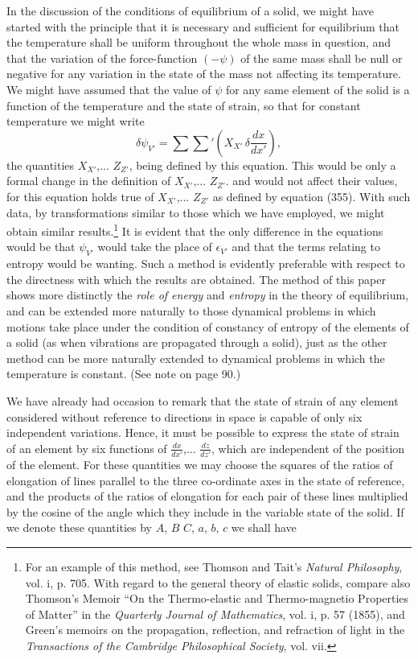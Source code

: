 \documentclass[12pt]{article}
\begin{document}
{In the discussion of the conditions of equilibrium of a solid, we might have started with the principle that it is necessary and sufficient for equilibrium that the temperature shall be uniform throughout the whole mass in question, and that the variation of the force-function $(-\psi)$ of the same mass shall be null or negative for any variation in the state of the mass not affecting its temperature.  We might have assumed that the value of $\psi$ for any same element of the solid is a function of the temperature and the state of strain, so that for constant temperature we might write
$$ \delta \psi_{V'} = \sum \sum\nolimits' \left( X_{X'}\,\delta \frac{dx}{dx'}\right) ,  $$
the quantities $X_{X'}$,... $Z_{Z'}$, being defined by this equation. This would be only a formal change in the definition of $X_{X'}$,... $Z_{Z'}$. and would not affect their values, for this equation holds true of $X_{X'}$,... $Z_{Z'}$ as defined by equation (355). With such data, by transformations similar to those which we have employed, we might obtain similar results.\footnote{For an example of this method, see Thomson and Tait's \textit{Natural Philosophy}, vol. i, p. 705. With regard to the general theory of elastic solids, compare also Thomson's Memoir ``On the Thermo-elastic and Thermo-magnetio Properties of Matter'' in the \textit{Quarterly Journal of Mathematics}, vol. i, p. 57 (1855), and Green's memoirs on the propagation, reflection, and refraction of light in the \textit{Transactions of the Cambridge Philosophical Society}, vol. vii.} It is evident that the only difference in the equations would be that $\psi_{V'}$ would take the place of $\epsilon_{V'}$ and that the terms relating to entropy would be wanting. Such a method is evidently preferable with respect to the directness with which the results are obtained. The method of this paper shows more distinctly the \textit{role of energy} and \textit{entropy} in the theory of equilibrium, and can be extended more naturally to those dynamical problems in which motions take place under the condition of constancy of entropy of the elements of a solid (as when vibrations are propagated through a solid), just as the other method can be more naturally extended to dynamical problems in which the temperature is constant. (See note on page 90.)


We have already had occasion to remark that the state of strain of any element considered without reference to directions in space is capable of only six independent variations. Hence, it must be possible to express the state of strain of an element by six functions of $\frac{dx}{dx'}$,... $\frac{dz}{dz'}$, which are independent of the position of the element. For these quantities we may choose the squares of the ratios of elongation of lines parallel to the three co-ordinate axes in the state of reference, and the products of the ratios of elongation for each pair of these lines multiplied by the cosine of the angle which they include in the variable state of the solid. If we denote these quantities by $A$, $B$ $C$, $a$, $b$, $c$ we shall have



}
\end{document}
